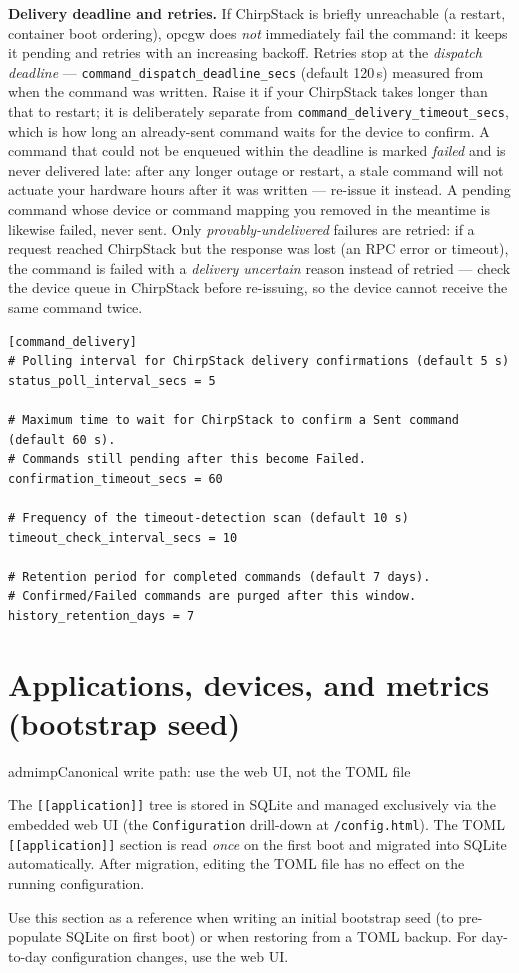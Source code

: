 \textbf{Delivery deadline and retries.} If ChirpStack is briefly unreachable (a restart, container boot ordering), opcgw does \emph{not} immediately fail the command: it keeps it pending and retries with an increasing backoff. Retries stop at the \emph{dispatch deadline} --- \texttt{command\_dispatch\_deadline\_secs} (default 120\,s) measured from when the command was written. Raise it if your ChirpStack takes longer than that to restart; it is deliberately separate from \texttt{command\_delivery\_timeout\_secs}, which is how long an already-sent command waits for the device to confirm. A command that could not be enqueued within the deadline is marked \emph{failed} and is never delivered late: after any longer outage or restart, a stale command will not actuate your hardware hours after it was written --- re-issue it instead. A pending command whose device or command mapping you removed in the meantime is likewise failed, never sent. Only \emph{provably-undelivered} failures are retried: if a request reached ChirpStack but the response was lost (an RPC error or timeout), the command is failed with a \emph{delivery uncertain} reason instead of retried --- check the device queue in ChirpStack before re-issuing, so the device cannot receive the same command twice.

\begin{lstlisting}
[command_delivery]
# Polling interval for ChirpStack delivery confirmations (default 5 s)
status_poll_interval_secs = 5

# Maximum time to wait for ChirpStack to confirm a Sent command (default 60 s).
# Commands still pending after this become Failed.
confirmation_timeout_secs = 60

# Frequency of the timeout-detection scan (default 10 s)
timeout_check_interval_secs = 10

# Retention period for completed commands (default 7 days).
# Confirmed/Failed commands are purged after this window.
history_retention_days = 7
\end{lstlisting}

\section{Applications, devices, and metrics (bootstrap seed)}\label{sec-application-config}

\begin{admonition}{admimp}{Canonical write path: use the web UI, not the TOML file}

The \texttt{{[}{[}application{]}{]}} tree is stored in SQLite and managed exclusively via the embedded web UI (the \texttt{Configuration} drill-down at \texttt{/config.html}). The TOML \texttt{{[}{[}application{]}{]}} section is read \emph{once} on the first boot and migrated into SQLite automatically. After migration, editing the TOML file has no effect on the running configuration.

Use this section as a reference when writing an initial bootstrap seed (to pre-populate SQLite on first boot) or when restoring from a TOML backup. For day-to-day configuration changes, use the web UI.

\end{admonition}


